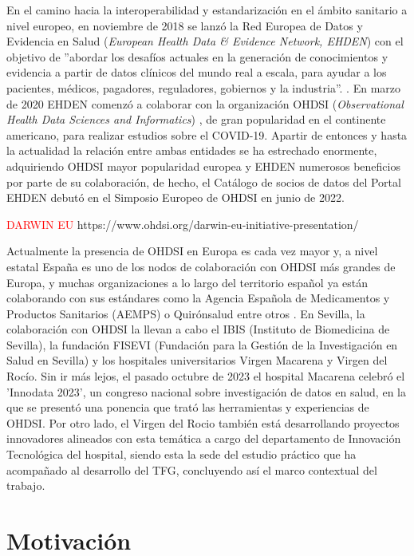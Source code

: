 En el camino hacia la interoperabilidad y estandarización en el ámbito sanitario a nivel europeo, en noviembre de 2018 se lanzó la Red Europea de Datos y Evidencia en Salud (\textit{European Health Data \& Evidence Network, EHDEN}) con el objetivo de ''abordar los desafíos actuales en la generación de conocimientos y evidencia a partir de datos clínicos del mundo real a escala, para ayudar a los pacientes, médicos, pagadores, reguladores, gobiernos y la industria''. \cite{ehden}. En marzo de 2020 EHDEN comenzó a colaborar con la organización OHDSI (\textit{Observational Health Data Sciences and Informatics}) \cite{ohdsi}, de gran popularidad en el continente americano, para realizar estudios sobre el COVID-19. Apartir de entonces y hasta la actualidad la relación entre ambas entidades se ha estrechado enormente, adquiriendo OHDSI mayor popularidad europea y EHDEN numerosos beneficios por parte de su colaboración, de hecho, el Catálogo de socios de datos del Portal EHDEN debutó en el Simposio Europeo de OHDSI en junio de 2022. 

\textcolor{red}{DARWIN EU} https://www.ohdsi.org/darwin-eu-initiative-presentation/

Actualmente la presencia de OHDSI en Europa es cada vez mayor y, a nivel estatal España es uno de los nodos de colaboración con OHDSI más grandes de Europa, y muchas organizaciones a lo largo del territorio español ya están colaborando con sus estándares como la Agencia Española de Medicamentos y Productos Sanitarios (AEMPS) o Quirónsalud entre otros \cite{ohdsiSpain}. En Sevilla, la colaboración con OHDSI la llevan a cabo el IBIS (Instituto de Biomedicina de Sevilla), la fundación FISEVI (Fundación para la Gestión de la Investigación en Salud en Sevilla) y los hospitales universitarios Virgen Macarena y Virgen del Rocío. Sin ir más lejos, el pasado octubre de 2023 el hospital Macarena celebró el 'Innodata 2023', un congreso nacional sobre investigación de datos en salud, en la que se presentó una ponencia que trató las herramientas y experiencias de OHDSI. Por otro lado, el Virgen del Rocio también está desarrollando proyectos innovadores alineados con esta temática a cargo del departamento de Innovación Tecnológica del hospital, siendo esta la sede del estudio práctico que ha acompañado al desarrollo del TFG, concluyendo así el marco contextual del trabajo.



\section{Motivación} \label{sec:01Motivacion}

